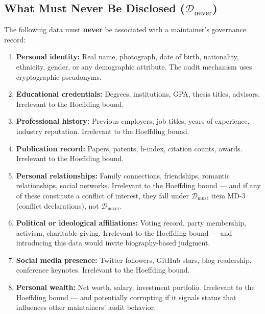 \documentclass[12pt,a4paper]{article}
\theoremstyle{remark}
\begin{document}
\subsection{What Must Never Be Disclosed ($\mathcal{D}_{\text{never}}$)}

The following data must \textbf{never} be associated with a maintainer's
governance record:

\begin{enumerate}[label=\textbf{ND-\arabic*:}, leftmargin=*]
    \item \textbf{Personal identity:} Real name, photograph, date of birth,
          nationality, ethnicity, gender, or any demographic attribute. The
          audit mechanism uses cryptographic pseudonyms.
    \item \textbf{Educational credentials:} Degrees, institutions, GPA, thesis
          titles, advisors. Irrelevant to the Hoeffding bound.
    \item \textbf{Professional history:} Previous employers, job titles, years
          of experience, industry reputation. Irrelevant to the Hoeffding bound.
    \item \textbf{Publication record:} Papers, patents, h-index, citation counts,
          awards. Irrelevant to the Hoeffding bound.
    \item \textbf{Personal relationships:} Family connections, friendships,
          romantic relationships, social networks. Irrelevant to the Hoeffding
          bound — and if any of these constitute a conflict of interest, they
          fall under $\mathcal{D}_{\text{must}}$ item MD-3 (conflict declarations),
          not $\mathcal{D}_{\text{never}}$.
    \item \textbf{Political or ideological affiliations:} Voting record, party
          membership, activism, charitable giving. Irrelevant to the Hoeffding
          bound — and introducing this data would invite biography-based judgment.
    \item \textbf{Social media presence:} Twitter followers, GitHub stars,
          blog readership, conference keynotes. Irrelevant to the Hoeffding bound.
    \item \textbf{Personal wealth:} Net worth, salary, investment portfolio.
          Irrelevant to the Hoeffding bound — and potentially corrupting if it
          signals status that influences other maintainers' audit behavior.
\end{enumerate}

\noindent\textbf{}
\end{document}
